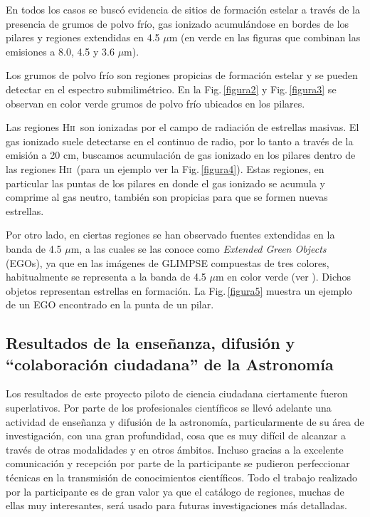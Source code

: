 \documentclass[baaa]{baaa}
\newcommand{\hii}{H\textsc{ii}}
\begin{document}
En todos los casos se buscó evidencia de sitios de formación estelar a través de la presencia de grumos de polvo frío, gas ionizado acumulándose en bordes de los pilares y regiones extendidas en 4.5 $\mu$m (en verde en las figuras que combinan las emisiones a 8.0, 4.5 y 3.6 \(\mu\)m).

Los grumos de polvo frío son regiones propicias de formación estelar y se pueden detectar en el espectro submilimétrico. En la Fig.\,\ref{figura2} y Fig.\,\ref{figura3} se observan en color verde grumos de polvo frío ubicados en los pilares.

Las regiones \hii~son ionizadas por el campo de radiación de estrellas masivas. El gas ionizado suele detectarse en el continuo de radio, por lo tanto a través de la emisión a 20 cm, buscamos acumulación de gas ionizado en los pilares dentro de las regiones \hii~(para un ejemplo ver la Fig.\,\ref{figura4}). Estas regiones, en particular las puntas de los pilares en donde el gas ionizado se acumula y comprime al gas neutro, también son propicias para que se formen nuevas estrellas.

Por otro lado, en ciertas regiones se han observado fuentes extendidas en la banda de 4.5 \(\mu\)m, a las cuales se las conoce como {\it Extended Green Objects} (EGOs), ya que en las imágenes de GLIMPSE compuestas de tres colores, habitualmente se representa a la banda de 4.5 \(\mu\)m en color verde (ver \citealt{cyga08}). Dichos objetos representan estrellas en formación. La Fig.\,\ref{figura5} muestra un ejemplo de un EGO encontrado en la punta de un pilar.


\subsection{Resultados de la enseñanza, difusión y ``colaboración ciudadana'' de la Astronomía} 
\label{rp}

Los resultados de este proyecto piloto de ciencia ciudadana ciertamente fueron superlativos. Por parte de los profesionales científicos se llevó adelante una actividad de enseñanza y difusión de la astronomía, particularmente de su área de investigación, con una gran profundidad, cosa que es muy difícil de alcanzar a través de otras modalidades y en otros ámbitos. Incluso gracias a la excelente comunicación y recepción por parte de la participante se pudieron perfeccionar técnicas en la transmisión de conocimientos científicos. Todo el trabajo realizado por la participante es de gran valor ya que el catálogo de regiones, muchas de ellas muy interesantes, será usado para futuras investigaciones más detalladas.
\end{document}
